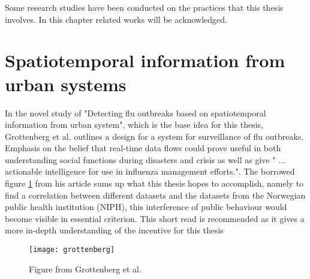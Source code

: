 Some research studies have been conducted on the practices that this thesis involves. In this chapter related works will be acknowledged.

\section{Spatiotemporal information from urban systems}
In the novel study of "Detecting flu outbreaks based on spatiotemporal information from urban system", which is the base idea for this thesis, Grottenberg et al. \cite{spatiotemp_urban_sys} outlines a design for a system for surveillance of flu outbreaks. Emphasis on the belief that real-time data flows could prove useful in both understanding social functions during disasters and crisis as well as give " ... actionable intelligence for use in influenza management efforts.".
The borrowed figure \ref{fig:grottenberg} from his article sums up what this thesis hopes to accomplish, namely to find a correlation between different datasets and the datasets from the Norwegian public health institution (NIPH), this interference of public behaviour would become visible in essential criterion.
This short read \cite{spatiotemp_urban_sys} is recommended as it gives a more in-depth understanding of the incentive for this thesis

\begin{figure}[h]
\texttt{[image: grottenberg]}
\centering
\caption{Figure from Grottenberg et al. \cite{spatiotemp_urban_sys}}
\label{fig:grottenberg}
\end{figure}





